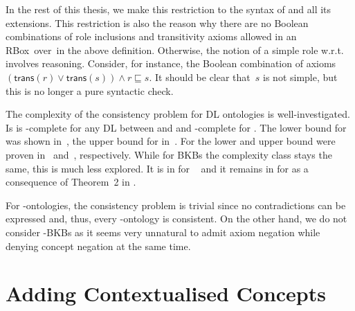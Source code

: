 In the rest of this thesis, we make this restriction to the syntax of \SHQ and all its
extensions.
%
This restriction is also the reason why there are no Boolean combinations of
role inclusions and transitivity axioms allowed in an RBox~\Rmc over~\Nsig in
the above definition.  Otherwise, the notion of a simple role w.r.t.~\Rmc
involves reasoning.  Consider, for instance, the Boolean combination of axioms
$(\mathsf{trans}(r)\lor\mathsf{trans}(s))\land r\sqsubseteq s$.  It should be
clear that~$s$ is not simple, but this is no longer a pure syntactic check.

The complexity of the consistency problem for DL ontologies is well-investigated. Is is
\ExpTime-complete for any DL between \ALC and \SHOQ and \NExpTime-complete for \SHOIQ. The lower
bound for \ALC was shown in~\cite{Sch-IJCAI91}, the upper bound for \SHOQ in~\cite{Tob-PhD01}. For
\SHOIQ the lower and upper bound were proven in~\cite{Tob-JAIR00} and~\cite{Tob-PhD01},
respectively. While for BKBs the complexity class stays the same, this is much less explored. It is
in \ExpTime for \SHOQ~\cite{Lip-PhD14} and it remains in \NExpTime for \SHOIQ as a consequence of
Theorem~2 in \cite{Pra-JLLI05}.

For \EL-ontologies, the consistency problem is trivial since no contradictions can be expressed and,
thus, every \EL-ontology is consistent. On the other hand, we do not consider \EL-BKBs as it seems
very unnatural to admit axiom negation while denying concept negation at the same time.




\section{Adding Contextualised Concepts}
\label{sec:adding-cont-concepts}




\cleardoublepage


